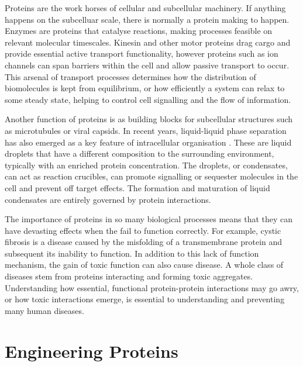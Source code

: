 Proteins are the work horses of cellular and subcellular machinery. If anything happens on the subcelluar scale, there is normally a protein making to happen. Enzymes are proteins that catalyse reactions, making processes feasible on relevant molecular timescales. \cite{alberts_molecular_2008} Kinesin and other motor proteins drag cargo and provide essential active transport functionality, \cite{hirokawa_molecular_2010} however proteins such as ion channels can span barriers within the cell and allow passive transport to occur. \cite{berg_biochemistry_2002} This arsenal of transport processes determines how the distribution of biomolecules is kept from equilibrium, or how efficiently a system can relax to some steady state, helping to control cell signalling and the flow of information.

Another function of proteins is as building blocks for subcellular structures such as microtubules or viral capsids. \cite{keskin_principles_2008} In recent years, liquid-liquid phase separation has also emerged as a key feature of intracellular organisation \cite{shin, banani_biomolecular_2017}. These are liquid droplets that have a different composition to the surrounding environment, typically with an enriched protein concentration. The droplets, or condensates, can act as reaction crucibles, can promote signalling or sequester molecules in the cell and prevent off target effects. \cite{shin_liquid_2017} The formation and maturation of liquid condensates are entirely governed by protein interactions.

The importance of proteins in so many biological processes means that they can have devasting effects when the fail to function correctly. For example, cystic fibrosis is a disease caused by the misfolding of a transmembrane protein and subsequent its inability to function. \cite{luheshi_protein_2008} In addition to this lack of function mechanism, the gain of toxic function can also cause disease. \cite{dobson_protein_2003} A whole class of diseases stem from proteins interacting and forming toxic aggregates. \cite{chiti_protein_2006, chiti_protein_2017} Understanding how essential, functional protein-protein interactions may go awry, or how toxic interactions emerge, is essential to understanding and preventing many human diseases.

\section{Engineering Proteins}

